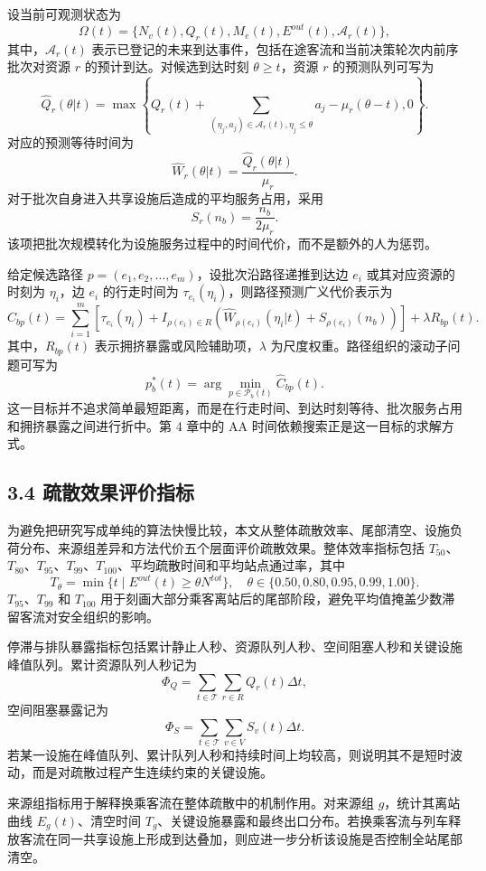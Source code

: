 \documentclass[UTF8,a4paper,12pt]{ctexart}
\begin{document}
设当前可观测状态为
\[
\Omega(t)=\{N_v(t),Q_r(t),M_e(t),E^{out}(t),\mathcal A_r(t)\},
\]
其中，\(\mathcal A_r(t)\) 表示已登记的未来到达事件，包括在途客流和当前决策轮次内前序批次对资源 \(r\) 的预计到达。对候选到达时刻 \(\theta\geq t\)，资源 \(r\) 的预测队列可写为
\[
\widehat Q_r(\theta|t)=
\max\left\{
Q_r(t)+
\sum_{(\eta_j,a_j)\in\mathcal A_r(t),\eta_j\leq \theta}a_j
-\mu_r(\theta-t),0
\right\}.
\]
对应的预测等待时间为
\[
\widehat W_r(\theta|t)=\frac{\widehat Q_r(\theta|t)}{\mu_r}.
\]
对于批次自身进入共享设施后造成的平均服务占用，采用
\[
S_r(n_b)=\frac{n_b}{2\mu_r}.
\]
该项把批次规模转化为设施服务过程中的时间代价，而不是额外的人为惩罚。

给定候选路径 \(p=(e_1,e_2,\ldots,e_m)\)，设批次沿路径递推到达边 \(e_i\) 或其对应资源的时刻为 \(\eta_i\)，边 \(e_i\) 的行走时间为 \(\tau_{e_i}(\eta_i)\)，则路径预测广义代价表示为
\[
\widehat C_{bp}(t)=
\sum_{i=1}^{m}
\left[
\tau_{e_i}(\eta_i)+
I_{\rho(e_i)\in R}
\left(
\widehat W_{\rho(e_i)}(\eta_i|t)+S_{\rho(e_i)}(n_b)
\right)
\right]
+\lambda R_{bp}(t).
\]
其中，\(R_{bp}(t)\) 表示拥挤暴露或风险辅助项，\(\lambda\) 为尺度权重。路径组织的滚动子问题可写为
\[
p_b^{*}(t)=\arg\min_{p\in\mathcal P_b(t)}\widehat C_{bp}(t).
\]
这一目标并不追求简单最短距离，而是在行走时间、到达时刻等待、批次服务占用和拥挤暴露之间进行折中。第 4 章中的 AA 时间依赖搜索正是这一目标的求解方式。

\subsection{3.4 疏散效果评价指标}

为避免把研究写成单纯的算法快慢比较，本文从整体疏散效率、尾部清空、设施负荷分布、来源组差异和方法代价五个层面评价疏散效果。整体效率指标包括 \(T_{50}\)、\(T_{80}\)、\(T_{95}\)、\(T_{99}\)、\(T_{100}\)、平均疏散时间和平均站点通过率，其中
\[
T_{\theta}=\min\{t\mid E^{out}(t)\geq \theta N^{tot}\},\quad
\theta\in\{0.50,0.80,0.95,0.99,1.00\}.
\]
\(T_{95}\)、\(T_{99}\) 和 \(T_{100}\) 用于刻画大部分乘客离站后的尾部阶段，避免平均值掩盖少数滞留客流对安全组织的影响。

停滞与排队暴露指标包括累计静止人秒、资源队列人秒、空间阻塞人秒和关键设施峰值队列。累计资源队列人秒记为
\[
\Phi_Q=\sum_{t\in\mathcal T}\sum_{r\in R}Q_r(t)\Delta t,
\]
空间阻塞暴露记为
\[
\Phi_S=\sum_{t\in\mathcal T}\sum_{v\in V}S_v(t)\Delta t.
\]
若某一设施在峰值队列、累计队列人秒和持续时间上均较高，则说明其不是短时波动，而是对疏散过程产生连续约束的关键设施。

来源组指标用于解释换乘客流在整体疏散中的机制作用。对来源组 \(g\)，统计其离站曲线 \(E_g(t)\)、清空时间 \(T_g\)、关键设施暴露和最终出口分布。若换乘客流与列车释放客流在同一共享设施上形成到达叠加，则应进一步分析该设施是否控制全站尾部清空。
\end{document}
